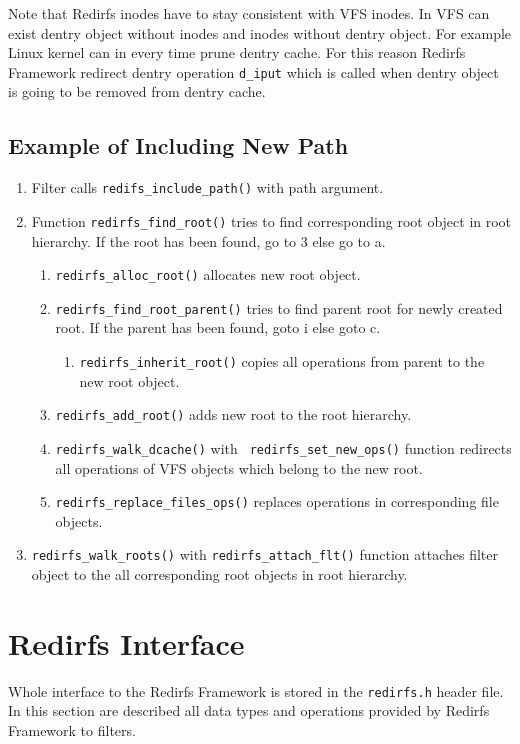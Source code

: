 Note that Redirfs inodes have to stay consistent with VFS inodes. In VFS can exist
dentry object without inodes and inodes without dentry object. For example Linux
kernel can in every time prune dentry cache. For this reason Redirfs Framework
redirect dentry operation \texttt{d\_iput} which is called when dentry object is going
to be removed from dentry cache.

\subsection{Example of Including New Path}
\begin{enumerate}
	\item Filter calls \texttt{redifs\_include\_path()} with path argument. 
	\item Function \texttt{redirfs\_find\_root()} tries to find corresponding root
		object in root hierarchy. If the root has been found,  go to 3 else
		go to a.
		\begin{enumerate}
			\item \texttt{redirfs\_alloc\_root()} allocates new root
				object.
			\item \texttt{redirfs\_find\_root\_parent()} tries to find
				parent root for newly created root. If the parent has
				been found, goto i else goto c.
				\begin{enumerate}
					\item \texttt{redirfs\_inherit\_root()} copies
						all operations from parent to the new
						root object.
				\end{enumerate}
			\item \texttt{redirfs\_add\_root()} adds new root to the root
				hierarchy.
			\item \texttt{redirfs\_walk\_dcache()} with \texttt{
				redirfs\_set\_new\_ops()} function redirects all operations of
				VFS objects which belong to the new root.
			\item \texttt{redirfs\_replace\_files\_ops()} replaces
				operations in corresponding file objects.
		\end{enumerate}
	\item \texttt{redirfs\_walk\_roots()} with \texttt{redirfs\_attach\_flt()}
		function attaches filter object to the all corresponding root objects in root
		hierarchy.
\end{enumerate}



\section{Redirfs Interface}
\label{lab:redirfs_interface}
Whole interface to the Redirfs Framework is stored in the \texttt{redirfs.h} header
file. In this section are described all data types and operations provided by Redirfs
Framework to filters.

